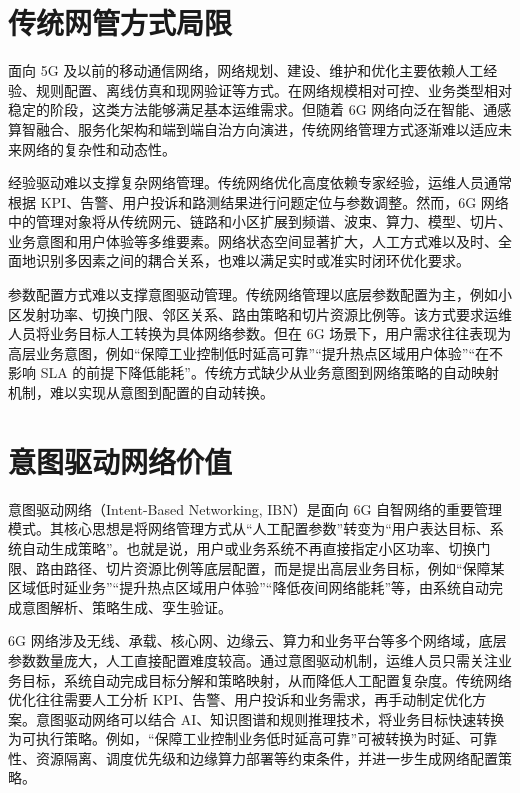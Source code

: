 \documentclass[lang=cn,12pt]{elegantbook}
\begin{document}
\section{传统网管方式局限}

面向 5G 及以前的移动通信网络，网络规划、建设、维护和优化主要依赖人工经验、规则配置、离线仿真和现网验证等方式。在网络规模相对可控、业务类型相对稳定的阶段，这类方法能够满足基本运维需求。但随着 6G 网络向泛在智能、通感算智融合、服务化架构和端到端自治方向演进，传统网络管理方式逐渐难以适应未来网络的复杂性和动态性。


经验驱动难以支撑复杂网络管理。传统网络优化高度依赖专家经验，运维人员通常根据 KPI、告警、用户投诉和路测结果进行问题定位与参数调整。然而，6G 网络中的管理对象将从传统网元、链路和小区扩展到频谱、波束、算力、模型、切片、业务意图和用户体验等多维要素。网络状态空间显著扩大，人工方式难以及时、全面地识别多因素之间的耦合关系，也难以满足实时或准实时闭环优化要求。


参数配置方式难以支撑意图驱动管理。传统网络管理以底层参数配置为主，例如小区发射功率、切换门限、邻区关系、路由策略和切片资源比例等。该方式要求运维人员将业务目标人工转换为具体网络参数。但在 6G 场景下，用户需求往往表现为高层业务意图，例如“保障工业控制低时延高可靠”“提升热点区域用户体验”“在不影响 SLA 的前提下降低能耗”。传统方式缺少从业务意图到网络策略的自动映射机制，难以实现从意图到配置的自动转换。

\section{意图驱动网络价值}

意图驱动网络（Intent-Based Networking, IBN）是面向 6G 自智网络的重要管理模式。其核心思想是将网络管理方式从“人工配置参数”转变为“用户表达目标、系统自动生成策略”。也就是说，用户或业务系统不再直接指定小区功率、切换门限、路由路径、切片资源比例等底层配置，而是提出高层业务目标，例如“保障某区域低时延业务”“提升热点区域用户体验”“降低夜间网络能耗”等，由系统自动完成意图解析、策略生成、孪生验证。


6G 网络涉及无线、承载、核心网、边缘云、算力和业务平台等多个网络域，底层参数数量庞大，人工直接配置难度较高。通过意图驱动机制，运维人员只需关注业务目标，系统自动完成目标分解和策略映射，从而降低人工配置复杂度。传统网络优化往往需要人工分析 KPI、告警、用户投诉和业务需求，再手动制定优化方案。意图驱动网络可以结合 AI、知识图谱和规则推理技术，将业务目标快速转换为可执行策略。例如，“保障工业控制业务低时延高可靠”可被转换为时延、可靠性、资源隔离、调度优先级和边缘算力部署等约束条件，并进一步生成网络配置策略。
\end{document}

